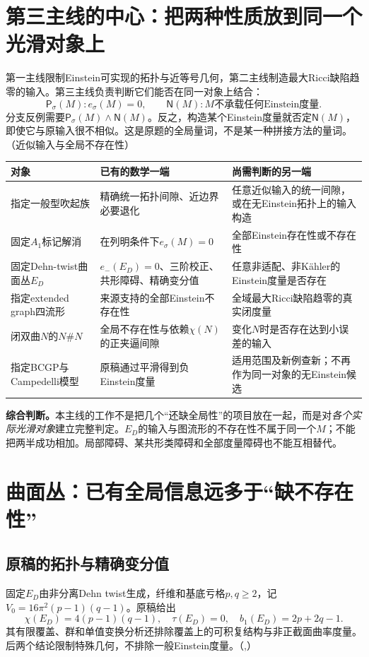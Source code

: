 \documentclass[UTF8,fontset=fandol,zihao=-4]{ctexart}
\theoremstyle{research}
\numberwithin{equation}{section}
\begin{document}
\section{第三主线的中心：把两种性质放到同一个光滑对象上}
第一主线限制Einstein可实现的拓扑与近等号几何，第二主线制造最大Ricci缺陷趋零的输入。第三主线负责判断它们能否在同一对象上结合：
\[
\mathsf P_\sigma(M):e_\sigma(M)=0,
\qquad\mathsf N(M):M\text{不承载任何Einstein度量}.
\]
分支反例需要$\mathsf P_\sigma(M)\land\mathsf N(M)$。反之，构造某个Einstein度量就否定$\mathsf N(M)$，即使它与原输入很不相似。这是原题的全局量词，不是某一种拼接方法的量词。\cite{G}（近似输入与全局不存在性）

\begin{longtable}{P{.25\textwidth}P{.32\textwidth}P{.33\textwidth}}
\toprule 对象 & 已有的数学一端 & 尚需判断的另一端\\\midrule\endhead
指定一般型吹起族 & 精确统一拓扑间隙、近边界必要退化 & 任意近似输入的统一间隙，或在无Einstein拓扑上的输入构造\\
固定$A_1$标记解消 & 在列明条件下$e_\sigma(M)=0$ & 全部Einstein存在性或不存在性\\
固定Dehn-twist曲面丛$E_D$ & $e_-(E_D)=0$、三阶校正、共形障碍、精确变分值 & 任意非适配、非Kähler的Einstein度量是否存在\\
指定extended graph四流形 & 来源支持的全部Einstein不存在性 & 全域最大Ricci缺陷趋零的真实闭度量\\
闭双曲$N$的$N\#N$ & 全局不存在性与依赖$\chi(N)$的正夹逼间隙 & 变化$N$时是否存在达到小误差的输入\\
指定BCGP与Campedelli模型 & 原稿通过平滑得到负Einstein度量 & 适用范围及新例查新；不再作为同一对象的无Einstein候选\\\bottomrule
\end{longtable}
\textbf{综合判断。}本主线的工作不是把几个“还缺全局性”的项目放在一起，而是对\emph{各个实际光滑对象}建立完整判定。$E_D$的输入与图流形的不存在性不属于同一个$M$；不能把两半成功相加。局部障碍、某共形类障碍和全部度量障碍也不能互相替代。

\section{曲面丛：已有全局信息远多于“缺不存在性”}
\subsection{原稿的拓扑与精确变分值}
固定$E_D$由非分离Dehn twist生成，纤维和基底亏格$p,q\ge2$，记$V_0=16\pi^2(p-1)(q-1)$。原稿给出
\[
\chi(E_D)=4(p-1)(q-1),\quad\tau(E_D)=0,
\quad b_1(E_D)=2p+2q-1.
\]
其有限覆盖、群和单值变换分析还排除覆盖上的可积复结构与非正截面曲率度量。后两个结论限制特殊几何，不排除一般Einstein度量。\cite{L}（,）
\end{document}
